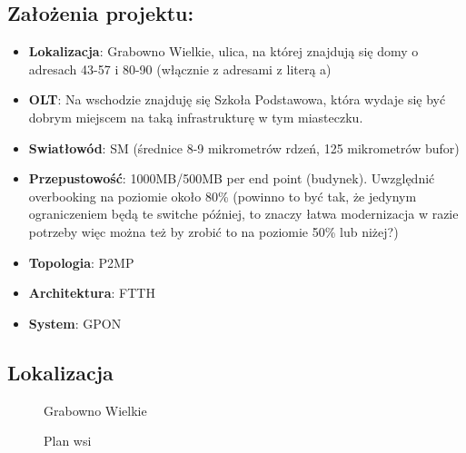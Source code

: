 \subsection{Założenia projektu:}
\begin{itemize}
	\item \textbf{Lokalizacja}: Grabowno Wielkie, ulica, na której znajdują się domy o adresach 43-57 i 80-90 (włącznie z adresami z literą a)
	\item \textbf{OLT}: Na wschodzie znajduję się Szkoła Podstawowa, która wydaje się być dobrym miejscem na taką infrastrukturę w tym miasteczku.
	\item \textbf{Swiatłowód}: SM (średnice 8-9 mikrometrów rdzeń, 125 mikrometrów bufor)
	\item \textbf{Przepustowość}: 1000MB/500MB per end point (budynek). Uwzględnić overbooking na poziomie około 80\% (powinno to być tak, że jedynym ograniczeniem będą te switche później, to znaczy łatwa modernizacja w razie potrzeby więc można też by zrobić to na poziomie 50\% lub niżej?)
	\item \textbf{Topologia}: P2MP
	\item \textbf{Architektura}: FTTH
	\item \textbf{System}: GPON
\end{itemize}

\newpage
\subsection{Lokalizacja}

	\begin{center}
		\begin{figure}[h!]
			\caption{Grabowno Wielkie}
			\label{fig:grabowno_intro}
		\end{figure}
		\begin{figure}[h!]
			\caption{Plan wsi}
			\label{fig:plan_intro}
		\end{figure}
	\end{center}

